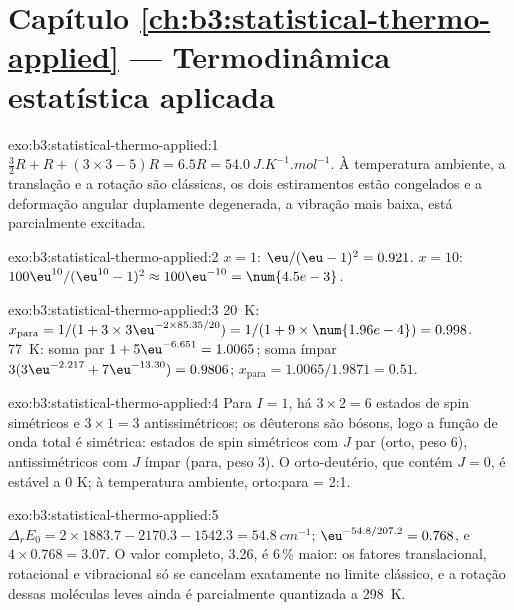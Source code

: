 \section*{Capítulo \ref{ch:b3:statistical-thermo-applied} --- Termodinâmica estatística aplicada}

\begin{solution}{exo:b3:statistical-thermo-applied:1}
$\frac32R + R + (3 \times 3 - 5)R = 6.5R = \qty{54.0}{J.K^{-1}.mol^{-1}}$. À temperatura ambiente, a translação
e a rotação são clássicas, os dois estiramentos estão congelados e a deformação
angular duplamente degenerada, a vibração mais baixa, está parcialmente excitada.
\end{solution}

\begin{solution}{exo:b3:statistical-thermo-applied:2}
$x = 1$: $\eu/(\eu - 1)^2 = 0.921$. $x = 10$: $100\eu^{10}/(\eu^{10} - 1)^2 \approx 100\eu^{-10} = \num{4.5e-3}$.
\end{solution}

\begin{solution}{exo:b3:statistical-thermo-applied:3}
\qty{20}{K}: $x_{\mathrm{para}} = 1/(1 + 3 \times 3\eu^{-2 \times 85.35/20}) = 1/(1 + 9 \times \num{1.96e-4}) = 0.998$.
\qty{77}{K}: soma par $1 + 5\eu^{-6.651} = 1.0065$; soma ímpar $3(3\eu^{-2.217} + 7\eu^{-13.30}) = 0.9806$;
$x_{\mathrm{para}} = 1.0065/1.9871 = 0.51$.
\end{solution}

\begin{solution}{exo:b3:statistical-thermo-applied:4}
Para $I = 1$, há $3 \times 2 = 6$ estados de spin simétricos e $3 \times 1 = 3$ antissimétricos;
os dêuterons são bósons, logo a função de onda total é simétrica: estados de spin
simétricos com $J$ par (orto, peso 6), antissimétricos com $J$ ímpar (para, peso
3). O orto-deutério, que contém $J = 0$, é estável a 0 K; à temperatura ambiente,
orto:para = 2:1.
\end{solution}

\begin{solution}{exo:b3:statistical-thermo-applied:5}
$\Delta_rE_0 = 2 \times 1883.7 - 2170.3 - 1542.3 = \qty{54.8}{cm^{-1}}$; $\eu^{-54.8/207.2} = 0.768$, e
$4 \times 0.768 = 3.07$. O valor completo, 3.26, é 6\,\% maior: os fatores translacional,
rotacional e vibracional só se cancelam exatamente no limite clássico, e a
rotação dessas moléculas leves ainda é parcialmente quantizada a \qty{298}{K}.
\end{solution}

